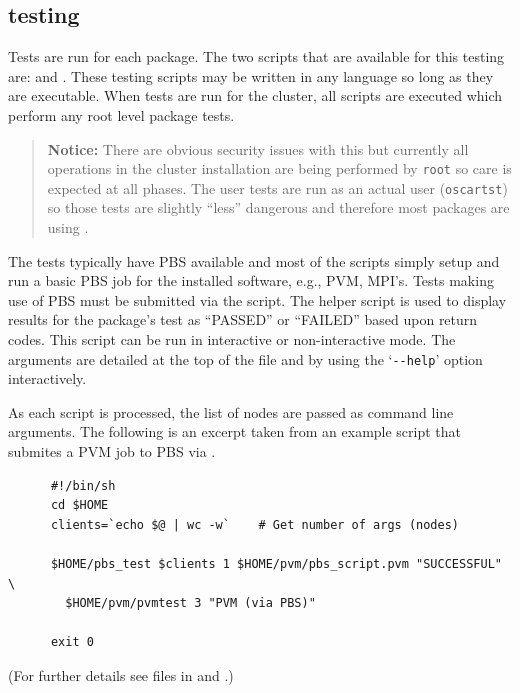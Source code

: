 \subsection{testing}
\label{sect:pkg-testing}

Tests are run for each package.  The two scripts that are available for
this testing are:  and .  These testing
scripts may be written in any language so long as they are executable. When
tests are run for the cluster, all  scripts are executed
which perform any root level package tests.    

\begin{verse}
   {\bfseries Notice: } There are obvious security issues with this but
   currently all operations in the cluster installation are being performed
   by {\tt root} so care is expected at all phases.  The user tests are run
   as an actual user ({\tt oscartst}) so those tests are slightly ``less''
   dangerous and therefore most packages are using .
\end{verse}


The tests typically have PBS available and most of the 
scripts simply setup and run a basic PBS job for the installed software,
e.g., PVM, MPI's.  Tests making use of PBS must be submitted via the
 script.  The  helper script is used to
display results for the package's test as ``PASSED'' or ``FAILED'' based
upon return codes.  This script can be run in interactive or
non-interactive mode.  The arguments are detailed at the top of the 
 file and by using the `\verb=--help=' option interactively.

As each  script is processed, the list of nodes are passed
as command line arguments.  The following is an excerpt taken from an
example  script that submites a PVM job to PBS via
.
\begin{footnotesize}
\begin{verbatim}
      #!/bin/sh
      cd $HOME
      clients=`echo $@ | wc -w`    # Get number of args (nodes)

      $HOME/pbs_test $clients 1 $HOME/pvm/pbs_script.pvm "SUCCESSFUL" \
        $HOME/pvm/pvmtest 3 "PVM (via PBS)"

      exit 0
\end{verbatim}
\end{footnotesize}
(For further details see files in  and
\file{\$OSCAR\_HOME/lib/OSCAR/Package.pm}.)


